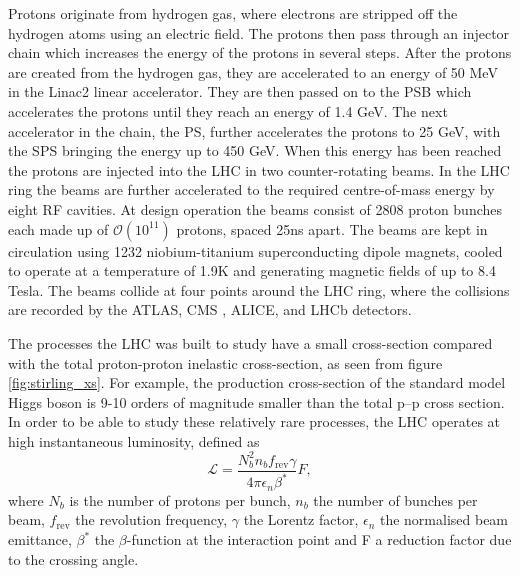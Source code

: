 Protons originate from hydrogen gas, where electrons are stripped off the 
hydrogen atoms using an electric field. The protons then pass through an injector
chain which increases the energy of the protons in several steps. After the protons
are created from the hydrogen gas, they are accelerated to an energy of
50 MeV in the Linac2 linear accelerator. They are then passed on to the
\acf{PSB} which accelerates the protons until they reach an energy of 1.4 GeV.
The next accelerator in the chain, the \acf{PS}, further accelerates the protons to 25 GeV,
with the \acf{SPS} bringing the energy up to 450 GeV. When this energy has been 
reached the protons are injected into the \ac{LHC} in two counter-rotating
beams. In the \ac{LHC} ring the beams are further accelerated to the required centre-of-mass energy
by eight \ac{RF} cavities. At design operation the beams consist of 2808 proton bunches each made up 
of $\mathcal{O}(10^{11})$ protons, spaced 25ns apart. The beams are kept in circulation
using 1232 niobium-titanium superconducting dipole magnets, cooled to operate at 
a temperature of 1.9K and generating magnetic fields of up to 8.4 Tesla.
The beams collide at four points
around the \ac{LHC} ring, where the collisions are recorded by the ATLAS\cite{atlas-jinst}, 
\acs{CMS} \cite{cms-jinst}, ALICE\cite{alice-jinst}, and LHCb\cite{lhcb-jinst} detectors.

The processes the \ac{LHC} was built to study have a small cross-section
compared with the total proton-proton inelastic cross-section, as seen from figure
\ref{fig:stirling_xs}. For example, the production cross-section of the
standard model Higgs boson is 9-10 orders of magnitude smaller than the total p--p cross section.
In order to be able to study these relatively rare processes, 
the LHC operates at high instantaneous luminosity, defined as
\begin{equation}\label{eqn:CMSLHC_luminosity}
\mathcal{L} = \frac{N_b^2n_bf_{\text{rev}}\gamma}{4\pi\epsilon_n\beta^{*}}F,
\end{equation}
where $N_b$ is the number of protons per bunch, $n_b$ the number of
bunches per beam, $f_{\text{rev}}$ the revolution frequency, $\gamma$ the 
Lorentz factor, $\epsilon_n$ the normalised beam
emittance, $\beta^{*}$ the $\beta$-function at the interaction point and F a reduction
factor due to the crossing angle. 

